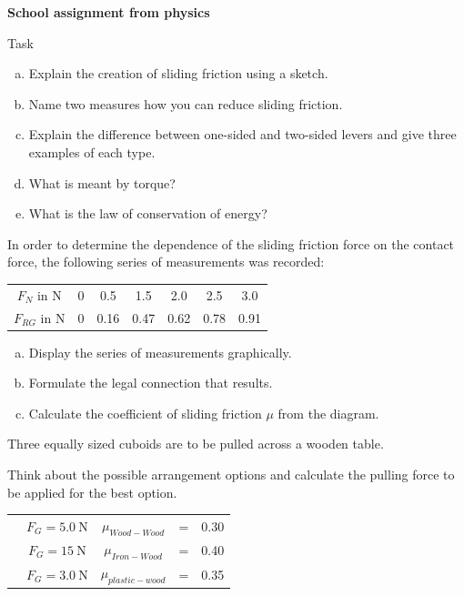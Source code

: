 \documentclass[a4paper]{article}
\begin{document}
	{\bf School assignment from physics }\\
	\begin{enumerate}[1.]
		
		{\bf \item Task}
		
		\begin{enumerate}[a)]
			\item Explain the creation of sliding friction using a sketch.
			\item Name two measures how you can reduce sliding friction.
			\item Explain the difference between one-sided and two-sided levers and give three examples of each type.
			\item What is meant by torque?
			\item What is the law of conservation of energy?
		\end{enumerate}
		
		{\bf \item In order to determine the dependence of the sliding friction force on the contact force, the following series of measurements was recorded:}
		
		\begin{tabular}{ccccccc}
			$F_N$ in N & 0 & 0.5 & 1.5 & 2.0 & 2.5 & 3.0 \\
			$F_{RG}$ in N & 0 & 0.16 & 0.47 & 0.62 & 0.78 & 0.91
		\end{tabular}
		
		\begin{enumerate}[a)]
			\item Display the series of measurements graphically.
			\item Formulate the legal connection that results.
			\item Calculate the coefficient of sliding friction $\mu$ from the diagram.
		\end{enumerate}
		
		
		{\bf \item Three equally sized cuboids are to be pulled across a wooden table.} Think about the possible arrangement options and calculate the pulling force to be applied for the best option.\\
		
		\renewcommand{\arraystretch}{1.5}
		\begin{tabular}{ccccc}
			\framebox[2.2 cm]{Wood} & $F_G=\SI{5.0}{\newton}$ & $\mu_{Wood-Wood}$ &=& 0.30 \\
			\framebox[2.2 cm]{Iron} & $F_G=\SI{15}{\newton}$ & $\mu_{Iron-Wood}$ &=& 0.40 \\
			\framebox[2.2 cm]{plastic} & $F_G=\SI{3.0}{\newton}$ & $\mu_{plastic-wood}$ &=& 0.35
		\end{tabular}
		

\end{enumerate}
\end{document}
